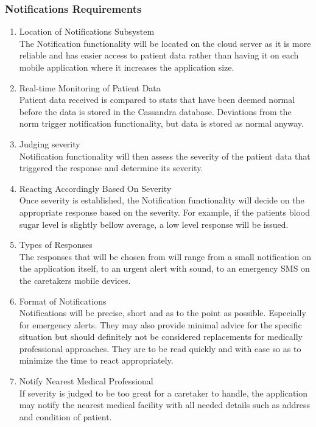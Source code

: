 \documentclass[12pt]{article}
\begin{document}
{{	    \subsubsection{Notifications Requirements}
        	\begin{enumerate}
            	\item{Location of Notifications Subsystem\\ The Notification functionality will be located on the cloud server as it is more reliable and has easier access to patient data rather than having it on each mobile application where it increases the application size.}
            	\item{Real-time Monitoring of Patient Data\\Patient data received is compared to stats that have been deemed normal before the data is stored in the Cassandra database. Deviations from the norm trigger notification functionality, but data is stored as normal anyway.}
                \item{Judging severity\\Notification functionality will then assess the severity of the patient data that triggered the response and determine its severity.}
                \item{Reacting Accordingly Based On Severity\\ Once severity is established, the Notification functionality will decide on the appropriate response based on the severity. For example, if the patients blood sugar level is slightly bellow average, a low level response will be issued.}
                \item{Types of Responses\\The responses that will be chosen from will range from a small notification on the application itself, to an urgent alert with sound, to an emergency SMS on the caretakers mobile devices.}
                \item{Format of Notifications\\Notifications will be precise, short and as to the point as possible. Especially for emergency alerts. They may also provide minimal advice for the specific situation but should definitely not be considered replacements for medically professional approaches. They are to be read quickly and with ease so as to minimize the time to react appropriately.}
                \item{Notify Nearest Medical Professional\\ If severity is judged to be too great for a caretaker to handle, the application may notify the nearest medical facility with all needed details such as address and condition of patient.}
            \end{enumerate}

}}
\end{document}
